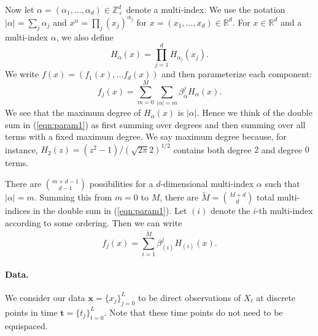\documentclass{article}
\newcommand{\bx}{\ensuremath{\mathbf{x}}}
\newcommand{\bt}{\ensuremath{\mathbf{t}}}
\begin{document}
Now let $\alpha = (\alpha_1, \ldots, \alpha_d) \in \mathbb{Z}^d_+$ denote a multi-index.  We use the notation $|\alpha| = \sum_j \alpha_j$ and $x^\alpha = \prod_j (x_j)^{\alpha_j}$ for $x = (x_1, \ldots, x_d) \in \mathbb{R}^d$.  For $x \in \mathbb{R}^d$ and a multi-index $\alpha$, we also define
\begin{equation}
\label{eqn:hermmultiindex}
H_\alpha(x) = \prod_{j=1}^d H_{\alpha_j}(x_j).
\end{equation}
We write $f(x) = (f_1(x), \ldots f_d(x))$ and then parameterize each component:
\begin{equation}
\label{eqn:param1}
f_j(x) = \sum_{m=0}^M \sum_{|\alpha|=m} \beta^j_\alpha H_\alpha(x).
\end{equation}
We see that the maximum degree of $H_\alpha(x)$ is $|\alpha|$.  Hence we think of the double sum in (\ref{eqn:param1}) as first summing over degrees and then summing over all terms with a fixed maximum degree.  We say maximum degree because, for instance, $H_2(z) = (z^2-1)/(\sqrt{2 \pi} 2)^{1/2}$ contains both degree $2$ and degree $0$ terms.

There are $\binom{m + d - 1}{d-1}$ possibilities for a $d$-dimensional multi-index $\alpha$ such that $|\alpha| = m$.  Summing this from $m=0$ to $M$, there are $\widetilde{M} = \binom{M+d}{d}$ total multi-indices in the double sum in (\ref{eqn:param1}).  Let $(i)$ denote the $i$-th multi-index according to some ordering.  Then we can write
\begin{equation}
\label{eqn:param2}
f_j(x) = \sum_{i=1}^{\widetilde{M}} \beta^j_{(i)} H_{(i)}(x).
\end{equation}

\paragraph{Data.} We consider our data $\bx = \{x_j\}_{j=0}^L$ to be direct observations of $X_t$ at discrete points in time $\bt = \{t_j\}_{t=0}^L$.  Note that these time points do not need to be equispaced.  
\end{document}
